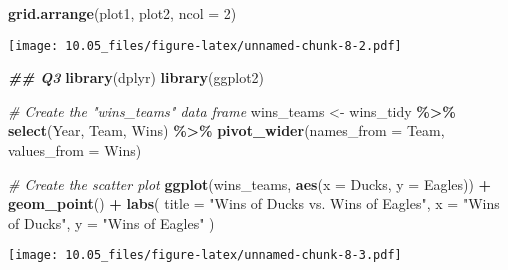 \documentclass[
]{article}
\newenvironment{Shaded}{\begin{snugshade}}{\end{snugshade}}
\newcommand{\AttributeTok}[1]{\textcolor[rgb]{0.13,0.29,0.53}{#1}}
\newcommand{\CommentTok}[1]{\textcolor[rgb]{0.56,0.35,0.01}{\textit{#1}}}
\newcommand{\DecValTok}[1]{\textcolor[rgb]{0.00,0.00,0.81}{#1}}
\newcommand{\DocumentationTok}[1]{\textcolor[rgb]{0.56,0.35,0.01}{\textbf{\textit{#1}}}}
\newcommand{\FunctionTok}[1]{\textcolor[rgb]{0.13,0.29,0.53}{\textbf{#1}}}
\newcommand{\NormalTok}[1]{#1}
\newcommand{\OtherTok}[1]{\textcolor[rgb]{0.56,0.35,0.01}{#1}}
\newcommand{\SpecialCharTok}[1]{\textcolor[rgb]{0.81,0.36,0.00}{\textbf{#1}}}
\newcommand{\StringTok}[1]{\textcolor[rgb]{0.31,0.60,0.02}{#1}}
\begin{document}
\begin{Shaded}
\begin{Highlighting}[]
\FunctionTok{grid.arrange}\NormalTok{(plot1, plot2, }\AttributeTok{ncol =} \DecValTok{2}\NormalTok{)}
\end{Highlighting}
\end{Shaded}

\texttt{[image: 10.05\_files/figure-latex/unnamed-chunk-8-2.pdf]}

\begin{Shaded}
\begin{Highlighting}[]
\DocumentationTok{\#\# Q3}
\FunctionTok{library}\NormalTok{(dplyr)}
\FunctionTok{library}\NormalTok{(ggplot2)}

\CommentTok{\# Create the "wins\_teams" data frame}
\NormalTok{wins\_teams }\OtherTok{\textless{}{-}}\NormalTok{ wins\_tidy }\SpecialCharTok{\%\textgreater{}\%}
  \FunctionTok{select}\NormalTok{(Year, Team, Wins) }\SpecialCharTok{\%\textgreater{}\%}
  \FunctionTok{pivot\_wider}\NormalTok{(}\AttributeTok{names\_from =}\NormalTok{ Team, }\AttributeTok{values\_from =}\NormalTok{ Wins)}

\CommentTok{\# Create the scatter plot}
\FunctionTok{ggplot}\NormalTok{(wins\_teams, }\FunctionTok{aes}\NormalTok{(}\AttributeTok{x =}\NormalTok{ Ducks, }\AttributeTok{y =}\NormalTok{ Eagles)) }\SpecialCharTok{+}
  \FunctionTok{geom\_point}\NormalTok{() }\SpecialCharTok{+}
  \FunctionTok{labs}\NormalTok{(}
    \AttributeTok{title =} \StringTok{"Wins of Ducks vs. Wins of Eagles"}\NormalTok{,}
    \AttributeTok{x =} \StringTok{"Wins of Ducks"}\NormalTok{,}
    \AttributeTok{y =} \StringTok{"Wins of Eagles"}
\NormalTok{  )}
\end{Highlighting}
\end{Shaded}

\texttt{[image: 10.05\_files/figure-latex/unnamed-chunk-8-3.pdf]}
\end{document}
